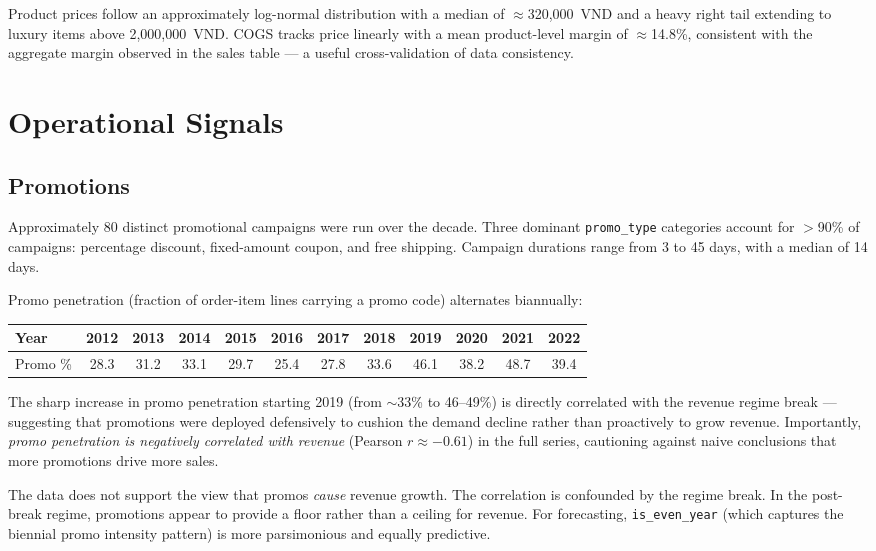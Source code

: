 \documentclass{article}
\begin{document}
Product prices follow an approximately log-normal distribution with a median of
$\approx$320,000~VND and a heavy right tail extending to luxury items above
2,000,000~VND.
COGS tracks price linearly with a mean product-level margin of $\approx$14.8\%,
consistent with the aggregate margin observed in the sales table — a useful
cross-validation of data consistency.

\section{Operational Signals}
\label{sec:ops}

\subsection{Promotions}
\label{subsec:promos}

Approximately 80 distinct promotional campaigns were run over the decade.
Three dominant \texttt{promo\_type} categories account for $>$90\% of
campaigns: percentage discount, fixed-amount coupon, and free shipping.
Campaign durations range from 3 to 45 days, with a median of 14 days.

Promo penetration (fraction of order-item lines carrying a promo code)
alternates biannually:

\begin{center}
\small
\begin{tabular}{lccccccccccc}
\toprule
Year & 2012 & 2013 & 2014 & 2015 & 2016 & 2017 & 2018 & 2019 & 2020 & 2021 & 2022 \\
\midrule
Promo \% & 28.3 & 31.2 & 33.1 & 29.7 & 25.4 & 27.8 & 33.6 & 46.1 & 38.2 & 48.7 & 39.4 \\
\bottomrule
\end{tabular}
\end{center}

The sharp increase in promo penetration starting 2019 (from $\sim$33\% to 46--49\%)
is directly correlated with the revenue regime break — suggesting that promotions
were deployed defensively to cushion the demand decline rather than proactively
to grow revenue.
Importantly, \emph{promo penetration is negatively correlated with revenue}
(Pearson $r \approx -0.61$) in the full series, cautioning against naive
conclusions that more promotions drive more sales.

\begin{insightbox}
The data does not support the view that promos \emph{cause} revenue growth.
The correlation is confounded by the regime break.
In the post-break regime, promotions appear to provide a floor rather than
a ceiling for revenue.
For forecasting, \texttt{is\_even\_year} (which captures the biennial promo
intensity pattern) is more parsimonious and equally predictive.
\end{insightbox}
\end{document}

